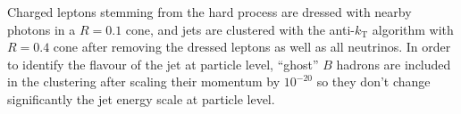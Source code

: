 Charged leptons stemming from the hard process are dressed with nearby photons in a $R=0.1$ cone, and jets are clustered with the anti-$k_\text{T}$ algorithm with  $R=0.4$ cone after removing the dressed leptons as well as all neutrinos. In order to identify the flavour of the jet at particle level, ``ghost'' $B$ hadrons are included in the clustering after scaling their momentum by $10^{-20}$ so they don't change significantly the jet energy scale at particle level.
